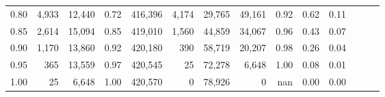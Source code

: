 \begin{tabular}{rrrrrrrrrrrrrr}
0.80 &   4,933 &  12,440 &  0.72 &  416,396 &    4,174 &  29,765 &  49,161 &  0.92 &  0.62 &      0.11 \\
0.85 &   2,614 &  15,094 &  0.85 &  419,010 &    1,560 &  44,859 &  34,067 &  0.96 &  0.43 &      0.07 \\
0.90 &   1,170 &  13,860 &  0.92 &  420,180 &      390 &  58,719 &  20,207 &  0.98 &  0.26 &      0.04 \\
0.95 &     365 &  13,559 &  0.97 &  420,545 &       25 &  72,278 &   6,648 &  1.00 &  0.08 &      0.01 \\
1.00 &      25 &   6,648 &  1.00 &  420,570 &        0 &  78,926 &       0 &   nan &  0.00 &      0.00 \\
\bottomrule
\end{tabular}

